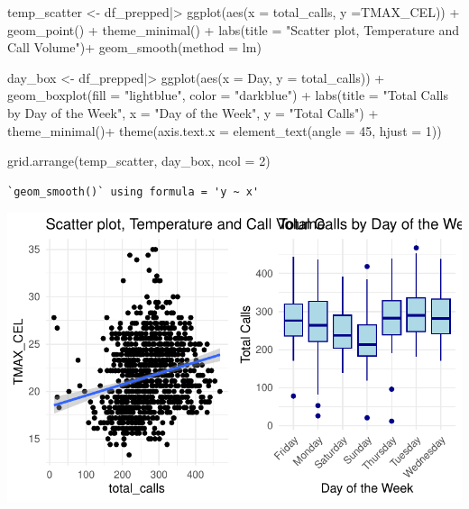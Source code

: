 \documentclass[
  letterpaper,
  DIV=11,
  numbers=noendperiod]{scrartcl}
\newenvironment{Shaded}{\begin{snugshade}}{\end{snugshade}}
\newcommand{\AttributeTok}[1]{\textcolor[rgb]{0.40,0.45,0.13}{#1}}
\newcommand{\DecValTok}[1]{\textcolor[rgb]{0.68,0.00,0.00}{#1}}
\newcommand{\FunctionTok}[1]{\textcolor[rgb]{0.28,0.35,0.67}{#1}}
\newcommand{\NormalTok}[1]{\textcolor[rgb]{0.00,0.23,0.31}{#1}}
\newcommand{\OtherTok}[1]{\textcolor[rgb]{0.00,0.23,0.31}{#1}}
\newcommand{\SpecialCharTok}[1]{\textcolor[rgb]{0.37,0.37,0.37}{#1}}
\newcommand{\StringTok}[1]{\textcolor[rgb]{0.13,0.47,0.30}{#1}}
\begin{document}
\begin{Shaded}
\begin{Highlighting}[]
\NormalTok{temp\_scatter }\OtherTok{\textless{}{-}}\NormalTok{ df\_prepped}\SpecialCharTok{|\textgreater{}}
  \FunctionTok{ggplot}\NormalTok{(}\FunctionTok{aes}\NormalTok{(}\AttributeTok{x =}\NormalTok{ total\_calls, }\AttributeTok{y =}\NormalTok{TMAX\_CEL)) }\SpecialCharTok{+} 
  \FunctionTok{geom\_point}\NormalTok{() }\SpecialCharTok{+} 
  \FunctionTok{theme\_minimal}\NormalTok{() }\SpecialCharTok{+} 
  \FunctionTok{labs}\NormalTok{(}\AttributeTok{title =} \StringTok{"Scatter plot, Temperature and Call Volume"}\NormalTok{)}\SpecialCharTok{+} 
  \FunctionTok{geom\_smooth}\NormalTok{(}\AttributeTok{method =}\NormalTok{ lm)}

\NormalTok{day\_box }\OtherTok{\textless{}{-}}\NormalTok{ df\_prepped}\SpecialCharTok{|\textgreater{}}
  \FunctionTok{ggplot}\NormalTok{(}\FunctionTok{aes}\NormalTok{(}\AttributeTok{x =}\NormalTok{ Day, }\AttributeTok{y =}\NormalTok{ total\_calls)) }\SpecialCharTok{+}
  \FunctionTok{geom\_boxplot}\NormalTok{(}\AttributeTok{fill =} \StringTok{"lightblue"}\NormalTok{, }\AttributeTok{color =} \StringTok{"darkblue"}\NormalTok{) }\SpecialCharTok{+}
  \FunctionTok{labs}\NormalTok{(}\AttributeTok{title =} \StringTok{"Total Calls by Day of the Week"}\NormalTok{, }\AttributeTok{x =} \StringTok{"Day of the Week"}\NormalTok{, }\AttributeTok{y =} \StringTok{"Total Calls"}\NormalTok{) }\SpecialCharTok{+}
  \FunctionTok{theme\_minimal}\NormalTok{()}\SpecialCharTok{+} 
  \FunctionTok{theme}\NormalTok{(}\AttributeTok{axis.text.x =} \FunctionTok{element\_text}\NormalTok{(}\AttributeTok{angle =} \DecValTok{45}\NormalTok{, }\AttributeTok{hjust =} \DecValTok{1}\NormalTok{))}

\FunctionTok{grid.arrange}\NormalTok{(temp\_scatter, day\_box, }\AttributeTok{ncol =} \DecValTok{2}\NormalTok{) }
\end{Highlighting}
\end{Shaded}

\begin{verbatim}
`geom_smooth()` using formula = 'y ~ x'
\end{verbatim}

\includegraphics{final_proj_group1_files/figure-pdf/scatter_plots-1.pdf}
\end{document}
